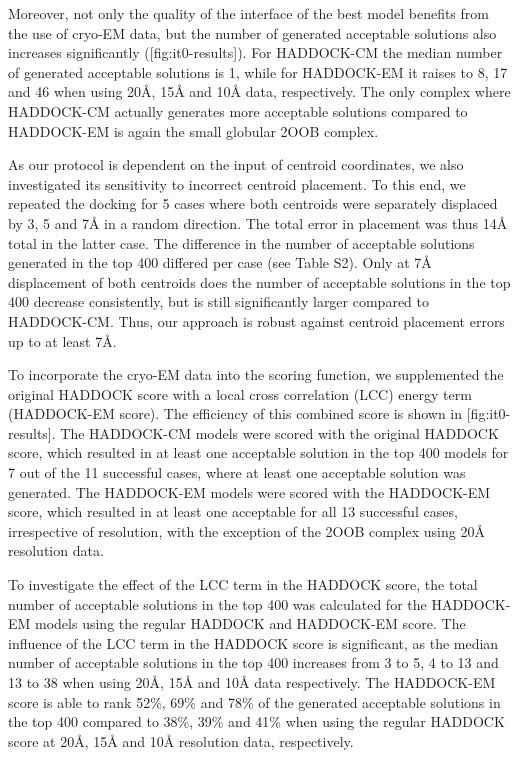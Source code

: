 Moreover, not only the quality of the interface of the best model benefits from
the use of cryo-EM data, but the number of generated acceptable solutions also
increases significantly ([fig:it0-results]).  For HADDOCK-CM the
median number of generated acceptable solutions is 1, while for HADDOCK-EM it
raises to 8, 17 and 46 when using 20Å, 15Å and 10Å data, respectively.  The
only complex where HADDOCK-CM actually generates more acceptable solutions
compared to HADDOCK-EM is again the small globular 2OOB complex.

As our protocol is dependent on the input of centroid coordinates, we also
investigated its sensitivity to incorrect centroid placement.  To this end, we
repeated the docking for 5 cases where both centroids were separately displaced
by 3, 5 and 7Å in a random direction.  The total error in placement was thus
14Å total in the latter case. The difference in the number of acceptable
solutions generated in the top 400 differed per case (see Table S2).  Only at
7Å displacement of both centroids does the number of acceptable solutions in
the top 400 decrease consistently, but is still significantly larger compared
to HADDOCK-CM.  Thus, our approach is robust against centroid placement errors
up to at least 7Å.



{}

To incorporate the cryo-EM data into the scoring function, we supplemented the
original HADDOCK score with a local cross correlation (LCC) energy term
(HADDOCK-EM score).  The efficiency of this combined score is shown in
[fig:it0-results].  The HADDOCK-CM models were scored with the
original HADDOCK score, which resulted in at least one acceptable solution in
the top 400 models for 7 out of the 11 successful cases, where at least one
acceptable solution was generated.  The HADDOCK-EM models were scored with the
HADDOCK-EM score, which resulted in at least one acceptable for all 13
successful cases, irrespective of resolution, with the exception of the 2OOB
complex using 20Å resolution data. 

To investigate the effect of the LCC term in the HADDOCK score, the total
number of acceptable solutions in the top 400 was calculated for the HADDOCK-EM
models using the regular HADDOCK and HADDOCK-EM score.  The influence of the
LCC term in the HADDOCK score is significant, as the median number of
acceptable solutions in the top 400 increases from 3 to 5, 4 to 13 and 13 to 38
when using 20Å, 15Å and 10Å data respectively.  The HADDOCK-EM score is able to
rank 52\%, 69\% and 78\% of the generated acceptable solutions in the top 400
compared to 38\%, 39\% and 41\% when using the regular HADDOCK score at 20Å,
15Å and 10Å resolution data, respectively.

